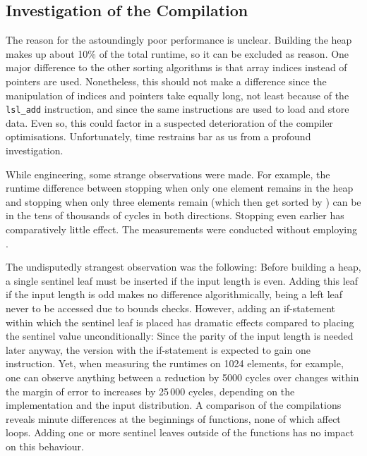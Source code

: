 \subsection*{Investigation of the Compilation}
\label{sec:tasklet:heap:compilation}

The reason for the astoundingly poor performance is unclear.
Building the heap makes up about 10\% of the total runtime, so it can be excluded as reason.
One major difference to the other sorting algorithms is that array indices instead of pointers are used.
Nonetheless, this should not make a difference since the manipulation of indices and pointers take equally long, not least because of the \lstinline|lsl_add| instruction, and since the same instructions are used to load and store data.
Even so, this could factor in a suspected deterioration of the compiler optimisations.
Unfortunately, time restrains bar as us from a profound investigation.

While engineering, some strange observations were made.
For example, the runtime difference between stopping \HS{} when only one element remains in the heap and stopping \HS{} when only three elements remain (which then get sorted by \IS{}) can be in the tens of thousands of cycles in both directions.
Stopping \HS{} even earlier has comparatively little effect.
The measurements were conducted without employing \IS{}.

The undisputedly strangest observation was the following:
Before building a heap, a single sentinel leaf must be inserted if the input length is even.
Adding this leaf if the input length is odd makes no difference algorithmically, being a left leaf never to be accessed due to bounds checks.
However, adding an if-statement within which the sentinel leaf is placed has dramatic effects compared to placing the sentinel value unconditionally:
Since the parity of the input length is needed later anyway, the version with the if-statement is expected to gain one instruction.
Yet, when measuring the runtimes on 1024 elements, for example, one can observe anything between a reduction by 5000 cycles over changes within the margin of error to increases by 25\,000 cycles, depending on the implementation and the input distribution.
A comparison of the compilations reveals minute differences at the beginnings of functions, none of which affect loops.
Adding one or more sentinel leaves outside of the functions has no impact on this behaviour.
